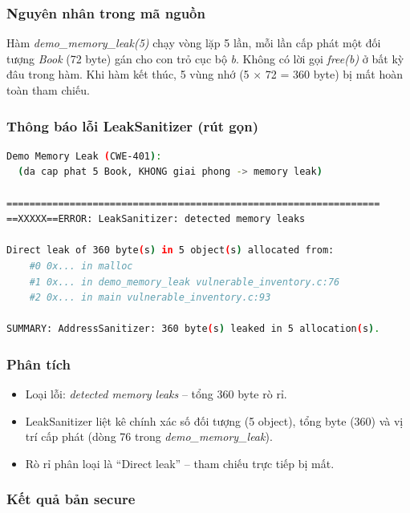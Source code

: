 \subsubsection{Nguyên nhân trong mã nguồn}

Hàm \textit{demo\_memory\_leak(5)} chạy vòng lặp 5 lần, mỗi lần cấp phát
một đối tượng \textit{Book} (72 byte) gán cho con trỏ cục bộ \textit{b}.
Không có lời gọi \textit{free(b)} ở bất kỳ đâu trong hàm. Khi hàm kết thúc,
5 vùng nhớ (5 $\times$ 72 = 360 byte) bị mất hoàn toàn tham chiếu.

\subsubsection{Thông báo lỗi LeakSanitizer (rút gọn)}

\begin{lstlisting}[language=bash, caption={LeakSanitizer output -- memory leaks detected}]
Demo Memory Leak (CWE-401):
  (da cap phat 5 Book, KHONG giai phong -> memory leak)

=================================================================
==XXXXX==ERROR: LeakSanitizer: detected memory leaks

Direct leak of 360 byte(s) in 5 object(s) allocated from:
    #0 0x... in malloc
    #1 0x... in demo_memory_leak vulnerable_inventory.c:76
    #2 0x... in main vulnerable_inventory.c:93

SUMMARY: AddressSanitizer: 360 byte(s) leaked in 5 allocation(s).
\end{lstlisting}

\subsubsection{Phân tích}

\begin{itemize}
    \item Loại lỗi: \textit{detected memory leaks} -- tổng 360 byte rò rỉ.
    \item LeakSanitizer liệt kê chính xác số đối tượng (5 object), tổng byte (360)
          và vị trí cấp phát (dòng 76 trong \textit{demo\_memory\_leak}).
    \item Rò rỉ phân loại là ``Direct leak'' -- tham chiếu trực tiếp bị mất.
\end{itemize}

\subsubsection{Kết quả bản secure}

